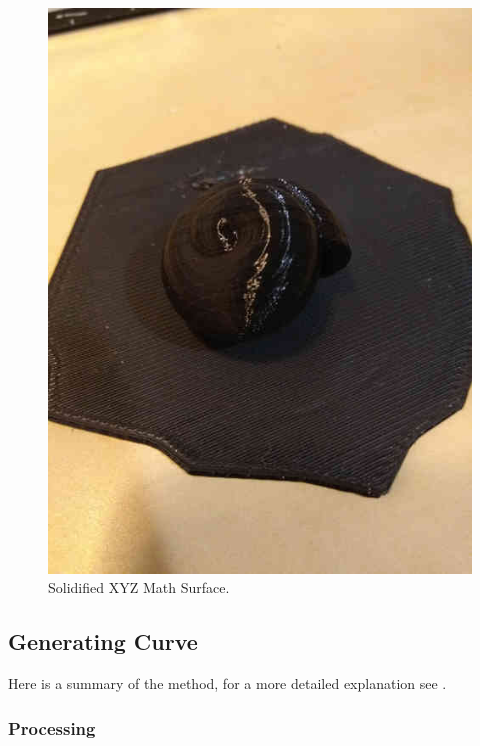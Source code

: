 \documentclass[a4paper]{article}
\begin{document}
\begin{figure}[h]
	\centering\includegraphics[scale=0.3]{./img/printed_modified_torus.jpg}
	\caption{Solidified XYZ Math Surface.}
	\label{3d-printed-torus} %
\end{figure}

\subsection{Generating Curve} 

Here is a summary of the method, for a more detailed explanation see \cite{JORGEPICADO}.

\subsubsection{Processing}
\end{document}
